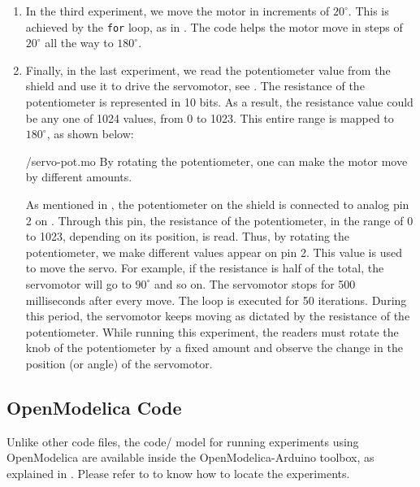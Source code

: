 \begin{enumerate}
        
  \item In the third experiment, we move the motor in increments of
        $20^\circ$.  This is achieved by the {\tt for} loop, as in
        . The code helps the motor move in steps of $20^\circ$ all
        the way to $180^\circ$.  
        
  \item Finally, in the last experiment, we read the potentiometer value
        from the shield and use it to drive the servomotor, see
        .  The resistance of the potentiometer is
        represented in 10 bits.  As a result, the resistance value could be
        any one of 1024 values, from 0 to 1023.  This entire range is
        mapped to $180^\circ$, as shown below:
        
        {\LocSEROpenModelicacode/servo-pot.mo}
        By rotating the potentiometer, one can make
        the motor move by different amounts.
        
        As mentioned in , the potentiometer on the shield is connected 
        to analog pin 2 on \arduino. Through this pin, the resistance of the potentiometer, in the range of 0 to 1023,
        depending on its position, is read.  Thus, by rotating the
        potentiometer, we make different values appear on pin 2.  This value
        is used to move the servo.  For example, if the resistance is half
        of the total, the servomotor will go to $90^\circ$ and so on.  The
        servomotor stops for 500 milliseconds after every move.  The loop is
        executed for 50 iterations. During this period, the servomotor keeps moving as dictated by the
        resistance of the potentiometer. While running this experiment, the readers 
        must rotate the knob of the potentiometer by a fixed amount and observe 
        the change in the position (or angle) of the servomotor. 
        
\end{enumerate}

\subsection{OpenModelica Code}
\lstset{style=mystyle}
\label{sec:servo-OpenModelica-code}
Unlike other code files, the code/ model for running experiments using OpenModelica are 
available inside the OpenModelica-Arduino toolbox, as explained in .
Please refer to  to know how to locate the experiments. 

